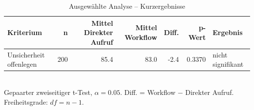 \begin{table}[htbp]
\centering
\caption{Ausgewählte Analyse -- Kurzergebnisse}
\begin{tabular}{lrrrrrl}
\toprule
Kriterium & n & Mittel Direkter Aufruf & Mittel Workflow & Diff. & p-Wert & Ergebnis \\
\midrule
Unsicherheit offenlegen & 200 & 85.4 & 83.0 & -2.4 & 0.3370 & nicht signifikant \\
\bottomrule
\end{tabular}
\\[2mm]
\footnotesize Gepaarter zweiseitiger t-Test, $\alpha=0.05$. Diff. = Workflow $-$ Direkter Aufruf. Freiheitsgrade: $df=n-1$.
\end{table}
